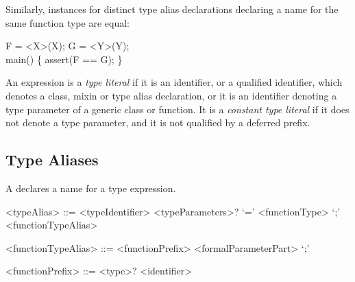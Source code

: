 \documentclass[makeidx]{article}
\begin{document}
{{Similarly,  instances for distinct type alias declarations
declaring a name for the same function type are equal:
}

\begin{dartCode}
\TYPEDEF{} F = \VOID{} \FUNCTION{}<X>(X);
\TYPEDEF{} G = \VOID{} \FUNCTION{}<Y>(Y);
\\
\VOID{} main() \{
  assert(F == G);
\}
\end{dartCode}

\LMHash{}%

\LMHash{}%
An expression is a \emph{type literal} if it is an identifier,
or a qualified identifier,
which denotes a class, mixin or type alias declaration, or it is
an identifier denoting a type parameter of a generic class or function.
It is a \emph{constant type literal} if it does not denote a type parameter,
and it is not qualified by a deferred prefix.


\subsection{Type Aliases}

\LMHash{}%
A  declares a name for a type expression.



\begin{grammar}
<typeAlias> ::= \gnewline{}
  \TYPEDEF{} <typeIdentifier> <typeParameters>? `=' <functionType> `;'
  \alt \TYPEDEF{} <functionTypeAlias>

<functionTypeAlias> ::= <functionPrefix> <formalParameterPart> `;'

<functionPrefix> ::= <type>? <identifier>
\end{grammar}

}
\end{document}
